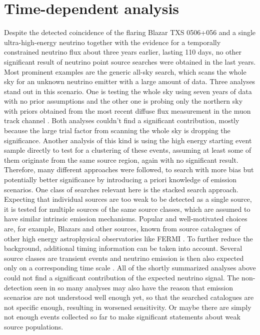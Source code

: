 \chapter{Time-dependent analysis}
  \label{chp:time_dep}
Despite the detected coincidence of the flaring Blazar TXS 0506+056 and a single ultra-high-energy neutrino together with the evidence for a temporally constrained neutrino flux about three years earlier, lasting 110 days, no other significant result of neutrino point source searches were obtained in the last years.
Most prominent examples are the generic all-sky search, which scans the whole sky for an unknown neutrino emitter with a large amount of data.
Three analyses stand out in this scenario.
One is testing the whole sky using seven years of data with no prior assumptions \cite{Aartsen:2016oji} and the other one is probing only the northern sky with priors obtained from the most recent diffuse flux measurement in the muon track channel \cite{Haack:2017dxi,Reimann:2017owh}.
Both analyses couldn't find a significant contribution, mostly because the large trial factor from scanning the whole sky is dropping the significance.
Another analysis of this kind is using the high energy starting event sample directly to test for a clustering of these events, assuming at least some of them originate from the same source region, again with no significant result.
Therefore, many different approaches were followed, to search with more bias but potentially better significance by introducing a priori knowledge of emission scenarios.
One class of searches relevant here is the stacked search approach.
Expecting that individual sources are too weak to be detected as a single source, it is tested for multiple sources of the same source classes, which are assumed to have similar intrinsic emission mechanisms.
Popular and well-motivated choices are, for example, Blazars and other sources, known from source catalogues of other high energy astrophysical observatories like FERMI \cite{Aartsen:2017zvw,Aartsen:2017wea,Aartsen:2016lir,Aartsen:2017ujz}.
To further reduce the background, additional timing information can be taken into account.
Several source classes are transient events and neutrino emission is then also expected only on a corresponding time scale \cite{Bianco:2007fe,Komossa:2015qya,Katz:2016dti}.
All of the shortly summarized analyses above could not find a significant contribution of the expected neutrino signal.
The non-detection seen in so many analyses may also have the reason that emission scenarios are not understood well enough yet, so that the searched catalogues are not specific enough, resulting in worsened sensitivity.
Or maybe there are simply not enough events collected so far to make significant statements about weak source populations.

